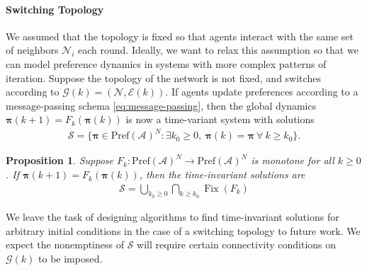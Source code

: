 \documentclass[conference]{ieeeconf}
\newcommand{\N}{\mathcal{N}}
\newcommand{\A}{\mathcal{A}}
\renewcommand{\S}{\mathcal{S}}
\newcommand{\G}{\mathcal{G}}
\newcommand{\E}{\mathcal{E}}
\newcommand{\Pref}{\mathrm{Pref}}
\newcommand{\profile}{\boldsymbol{\pi}}
\renewcommand{\geq}{\geqslant}
\DeclareMathOperator{\Fix}{Fix}
\newtheorem{proposition}{Proposition}
\begin{document}
\paragraph*{Switching Topology}
We assumed that the topology is fixed so that agents interact with the same set of neighbors $\N_i$ each round. Ideally, we want to relax this assumption so that we can model preference dynamics in systems with more complex patterns of iteration. Suppose the topology of the network is not fixed, and switches according to $\G(k) = \left(\N, \E(k)\right)$. If agents update preferences according to a message-passing schema \eqref{eq:message-passing}, then the global dynamics $\profile(k+1) = F_k\left( \profile(k)\right)$ is now a time-variant system with solutions
\begin{align*}
        \mathcal{S} = \{ \profile \in \Pref(\A)^N: \exists k_0 \geq 0,~\profile(k) = \profile~\forall~k \geq k_0 \}.
\end{align*}

\begin{proposition}
    Suppose $F_k: \Pref(\A)^N \to \Pref(\A)^N$ is monotone for all $k \geq 0$. If $\profile(k+1) = F_k\left( \profile(k)\right)$, then the time-invariant solutions are
    \begin{align*}
        \S = \bigcup_{k_0 \geq 0} \bigcap_{k \geq k_0} \Fix(F_k)
    \end{align*}
\end{proposition}
We leave the task of designing algorithms to find time-invariant solutions for arbitrary initial conditions in the case of a switching topology to future work. We expect the nonemptiness of $\S$ will require certain connectivity conditions on $\G(k)$ to be imposed.





\appendix
\end{document}
